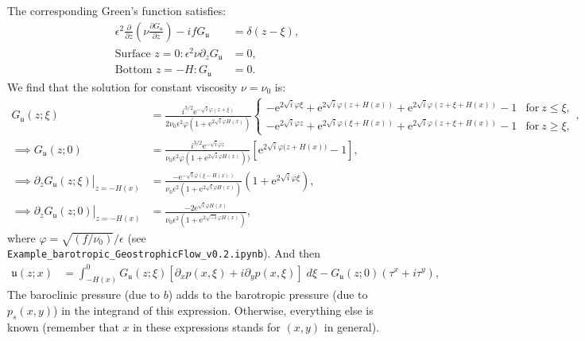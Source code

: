 \documentclass[10pt]{amsart}
\begin{document}
The corresponding Green's function satisfies:
\begin{align}
\epsilon^2 \frac{\partial}{\partial z} \left( \nu  \frac{\partial G_\mathfrak{u}}{\partial z} \right)  - i f  G_\mathfrak{u} & = \delta(z - \xi) ,  \\
\text{Surface~}z = 0:
\epsilon^2 \nu \partial_z G_\mathfrak{u} & = 0 ,
 \\
\text{Bottom~}z = -H:
G_\mathfrak{u} & = 0 .
\end{align}
We find that the solution for constant viscosity $\nu = \nu_0$ is:  
\begin{align}
 G_{ \mathfrak{u}}(z;\xi) & = 
\frac{ i^{3/2} \mathrm{e}^{- \sqrt{i} \varphi (z + \xi)} }{2  \nu_0 \epsilon^2 \varphi  \left(1 + \mathrm{e}^{2 \sqrt{i} \varphi H \left(x \right)} \right)}
\begin{cases} 
\displaystyle - \mathrm{e}^{2 \sqrt{i} \varphi \xi} + \mathrm{e}^{2 \sqrt{i} \varphi \left( z + H(x)\right)} + \mathrm{e}^{2 \sqrt{i} \varphi \left( z + \xi + H(x)\right)} - 1
 & \text{for}\: z \leq \xi , \\
\displaystyle - \mathrm{e}^{2 \sqrt{i} \varphi z} + \mathrm{e}^{2 \sqrt{i} \varphi \left( \xi + H(x)\right)} + \mathrm{e}^{2 \sqrt{i} \varphi \left( z + \xi + H(x)\right)} - 1
 & \text{for}\: z \geq \xi ,
\end{cases} , \label{eqn:FG_Gsfn} \\
\implies  G_{ \mathfrak{u}}(z;0) & = 
\frac{ i^{3/2} \mathrm{e}^{- \sqrt{i} \varphi z } }{ \nu_0 \epsilon^2 \varphi  \left(1 + \mathrm{e}^{2 \sqrt{i} \varphi H \left(x \right)} \right))}
\left[ \mathrm{e}^{2 \sqrt{i} \varphi ( z  + H{\left(x \right))}} - 1 \right] , \nonumber \\
\implies \partial_z \left. G_{ \mathfrak{u}}(z;\xi) \right|_{z = -H(x)} & = 
\frac{- \mathrm{e}^{-\sqrt{i} \varphi (\xi - H(x))  } }{ \nu_0 \epsilon^2 \left(1 + \mathrm{e}^{2 \sqrt{i} \varphi H \left(x \right)} \right)}
\left( 1 + \mathrm{e}^{2 \sqrt{i} \varphi \xi}\right) , \label{eqn:FG_Gsfn_bottom_deriv} \\
\implies \partial_z \left. G_{ \mathfrak{u}}(z;0) \right|_{z = -H(x)} & = 
\frac{- 2 \mathrm{e}^{\sqrt{i} \varphi H(x)  } }{ \nu_0 \epsilon^2 \left(1 + \mathrm{e}^{2 \sqrt{-i} \varphi H \left(x \right)} \right)}
 , \label{eqn:FG_Gsfn_bottom_deriv_top}
\end{align}
where $\varphi = \sqrt{\left( f / \nu_0 \right) } / \epsilon$ (see \texttt{Example\_barotropic\_GeostrophicFlow\_v0.2.ipynb}).
And then 
\begin{align}
\mathfrak{u} (z;x) & = \int_{-H(x)}^{0} G_{ \mathfrak{u}} (z; \xi) \left[ \partial_x p( x, \xi) + i \partial_y p( x, \xi) \right] \; d \xi 
 -   G_{\mathfrak{u}} (z; 0)  \left( \tau^x + i \tau^y \right)  ,
\end{align}
The baroclinic pressure (due to $b$) adds to the barotropic pressure (due to $p_s(x,y)$) in the integrand of this expression. 
Otherwise, everything else is known (remember that $x$ in these expressions stands for $(x,y)$ in general).
\end{document}
